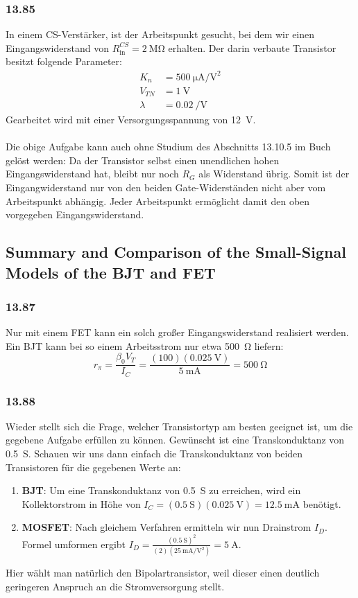 \documentclass[11pt,a4paper,titlepage]{article}
\begin{document}
\subsubsection*{13.85}
In einem CS-Verstärker, ist der Arbeitspunkt gesucht, bei dem wir einen Eingangswiderstand von $R_{\text{in}}^{CS} = \SI{2}{\mega\ohm}$ erhalten. Der darin verbaute Transistor besitzt folgende Parameter:
\begin{equation*}
\begin{aligned}
K_n &= \SI{500}{\micro\ampere\per\square\volt}\\
V_{TN} &= \SI{1}{\volt}\\
\lambda &= \SI{0.02}{\per\volt}
\end{aligned}
\end{equation*}
Gearbeitet wird mit einer Versorgungsspannung von \SI{12}{\volt}.\\
\\
Die obige Aufgabe kann auch ohne Studium des Abschnitts 13.10.5 im Buch gelöst werden: Da der Transistor selbst einen unendlichen hohen Eingangswiderstand hat, bleibt nur noch $R_G$ als Widerstand übrig. Somit ist der Eingangwiderstand nur von den beiden Gate-Widerständen nicht aber vom Arbeitspunkt abhängig. Jeder Arbeitspunkt ermöglicht damit den oben vorgegeben Eingangswiderstand.

\subsection{Summary and Comparison of the Small-Signal Models of the BJT and FET}
\subsubsection*{13.87}
Nur mit einem FET kann ein solch großer Eingangswiderstand realisiert werden. Ein BJT kann bei so einem Arbeitsstrom nur etwa \SI{500}{\ohm} liefern: 
\[r_{\pi}=\frac{\beta_0 V_T}{I_C}=\frac{(100)(\SI{0.025}{\volt})}{\SI{5}{\milli\ampere}}=\SI{500}{\ohm}\]

\subsubsection*{13.88}
Wieder stellt sich die Frage, welcher Transistortyp am besten geeignet ist, um die gegebene Aufgabe erfüllen zu können. Gewünscht ist eine Transkonduktanz von \SI{0.5}{\siemens}. Schauen wir uns dann einfach die Transkonduktanz von beiden Transistoren für die gegebenen Werte an:\\
\begin{enumerate}
	\item \textbf{BJT}: Um eine Transkonduktanz von \SI{0.5}{\siemens} zu erreichen, wird ein Kollektorstrom in Höhe von $I_C=(\SI{0.5}{\siemens})(\SI{0.025}{\volt}) = \SI{12.5}{\milli\ampere}$ benötigt.
	\item \textbf{MOSFET}: Nach gleichem Verfahren ermitteln wir nun Drainstrom $I_D$. Formel umformen ergibt $I_D=\frac{(\SI{0.5}{\siemens})^2}{(2)(\SI{25}{\milli\ampere\per\square\volt})}=\SI{5}{\ampere}$.
\end{enumerate} 
Hier wählt man natürlich den Bipolartransistor, weil dieser einen deutlich geringeren Anspruch an die Stromversorgung stellt.
\end{document}
